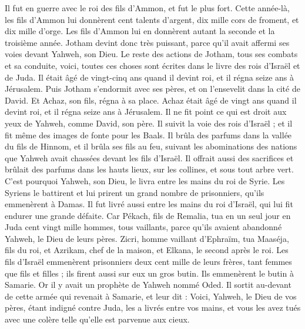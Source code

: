 \begin{multicols}{2}
Il fut en guerre avec le roi des fils d'Ammon, et fut le plus fort. Cette année-là, les fils d'Ammon lui donnèrent cent talents d'argent, dix mille cors de froment, et dix mille d'orge. Les fils d'Ammon lui en donnèrent autant la seconde et la troisième année.
Jotham devint donc très puissant, parce qu'il avait affermi ses voies devant Yahweh, son Dieu.
Le reste des actions de Jotham, tous ses combats et sa conduite, voici, toutes ces choses sont écrites dans le livre des rois d'Israël et de Juda.
Il était âgé de vingt-cinq ans quand il devint roi, et il régna seize ans à Jérusalem.
Puis Jotham s'endormit avec ses pères, et on l'ensevelit dans la cité de David. Et Achaz, son fils, régna à sa place.
\VerseOne{}Achaz était âgé de vingt ans quand il devint roi, et il régna seize ans à Jérusalem. Il ne fit point ce qui est droit aux yeux de Yahweh, comme David, son père.
Il suivit la voie des rois d'Israël ; et il fit même des images de fonte pour les Baals.
Il brûla des parfums dans la vallée du fils de Hinnom, et il brûla ses fils au feu, suivant les abominations des nations que Yahweh avait chassées devant les fils d'Israël.
Il offrait aussi des sacrifices et brûlait des parfums dans les hauts lieux, sur les collines, et sous tout arbre vert.
C'est pourquoi Yahweh, son Dieu, le livra entre les mains du roi de Syrie. Les Syriens le battirent et lui prirent un grand nombre de prisonniers, qu'ils emmenèrent à Damas. Il fut livré aussi entre les mains du roi d'Israël, qui lui fit endurer une grande défaite.
Car Pékach, fils de Remalia, tua en un seul jour en Juda cent vingt mille hommes, tous vaillants, parce qu'ils avaient abandonné Yahweh, le Dieu de leurs pères.
Zicri, homme vaillant d'Ephraïm, tua Maaséja, fils du roi, et Azrikam, chef de la maison, et Elkana, le second après le roi.
Les fils d'Israël emmenèrent prisonniers deux cent mille de leurs frères, tant femmes que fils et filles ; ils firent aussi sur eux un gros butin. Ils emmenèrent le butin à Samarie.
Or il y avait un prophète de Yahweh nommé Oded. Il sortit au-devant de cette armée qui revenait à Samarie, et leur dit : Voici, Yahweh, le Dieu de vos pères, étant indigné contre Juda, les a livrés entre vos mains, et vous les avez tués avec une colère telle qu'elle est parvenue aux cieux.

\end{multicols}
